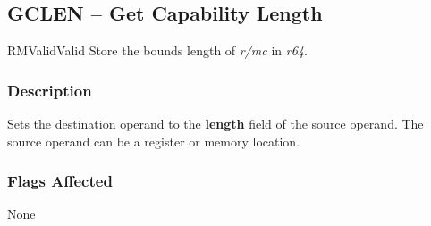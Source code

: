 \clearpage
{}
{}
\subsection*{GCLEN -- Get Capability Length}

\begin{x86opcodetable}
  {RM}{Valid}{Valid}
  {Store the bounds length of \emph{r/mc} in \emph{r64}.}
\end{x86opcodetable}

\begin{x86opentable}
\end{x86opentable}

\subsubsection*{Description}

Sets the destination operand to the \textbf{length} field of the
source operand.  The source operand can be a register or memory
location.

\subsubsection*{Flags Affected}

None
